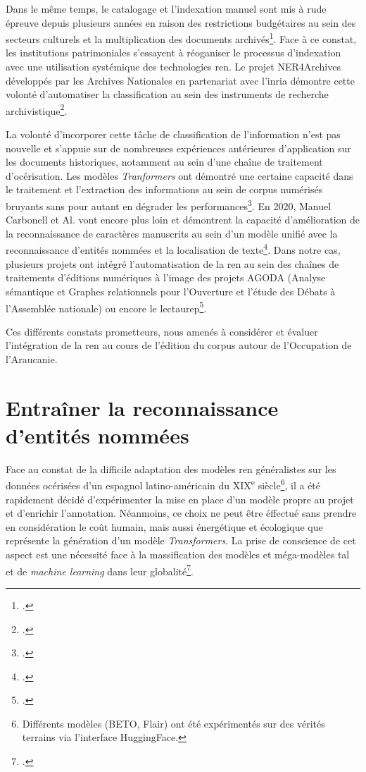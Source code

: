     Dans le même temps, le catalogage et l’indexation manuel sont mis à rude épreuve depuis plusieurs années en raison des restrictions budgétaires au sein des secteurs culturels et la multiplication des documents archivés\footcite{hengchenExtractionEntitesNommees2015}. Face à ce constat, les institutions patrimoniales s'essayent à réoganiser le processus d'indexation avec une utilisation systémique des technologies \gls{ren}. Le projet NER4Archives développés par les Archives Nationales en partenariat avec l'\gls{inria} démontre cette volonté d'automatiser la classification au sein des instruments de recherche archivistique\footcite{clavaudNER4ArchivesNamedEntity2022}.
    
    La volonté d'incorporer cette tâche de classification de l'information n'est pas nouvelle et s'appuie sur de nombreuses expériences antérieures d'application sur les documents historiques, notamment au sein d'une chaîne de traitement d'océrisation. Les modèles \textit{Tranformers} ont démontré une certaine capacité dans le traitement et l'extraction des informations au sein de corpus numérisés bruyants sans pour autant en dégrader les performances\footcite{borosAlleviatingDigitizationErrors2020}. En 2020, Manuel Carbonell et Al. vont encore plus loin et démontrent la capacité d'amélioration de la reconnaissance de caractères manuscrits au sein d'un modèle unifié avec la reconnaissance d'entités nommées et la localisation de texte\footcite{carbonellNeuralModelText2020}. Dans notre cas, plusieurs projets ont intégré l'automatisation de la \gls{ren} au sein des chaînes de traitements d'éditions numériques à l'image des projets AGODA (Analyse sémantique et Graphes relationnels pour l’Ouverture et l’étude des Débats à l'Assemblée nationale) ou encore le \gls{lectaurep}\footcite{bourgeoisUsingTopicGeneration2022, scheithauerReconnaissanceEntitesNommees2021}.
    
    Ces différents constats prometteurs, nous amenés à considérer et évaluer l'intégration de la \gls{ren} au cours de l'édition du corpus autour de l'Occupation de l'Araucanie.
	
	\section{Entraîner la reconnaissance d'entités nommées}
	
	Face au constat de la difficile adaptation des modèles \gls{ren} généralistes sur les données océrisées d'un espagnol latino-américain du XIX\textsuperscript{e} siècle\footnote{Différents modèles (BETO, Flair) ont été expérimentés sur des vérités terrains via l'interface HuggingFace.}, il a été rapidement décidé d'expérimenter la mise en place d'un modèle propre au projet et d'enrichir l'annotation. Néanmoins, ce choix ne peut être éffectué sans prendre en considération le coût humain, mais aussi énergétique et écologique que représente la génération d'un modèle \textit{Transformers}. La prise de conscience de cet aspect est une nécessité face à la massification des modèles et méga-modèles \gls{tal} et de \textit{machine learning} dans leur globalité\footcite{strubellEnergyPolicyConsiderations2019}.
	
